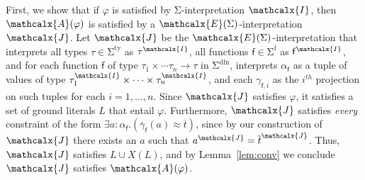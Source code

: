 \documentclass[runningheads,a4paper]{llncs}
\newcommand{\con}[1]{\mathsf{#1}}
\renewcommand\vec[1]{\overline{#1}}
\let\oldchi=\chi
\def\chi{{\vthinspace\oldchi}}
\let\oldSigma=\Sigma
\def\Sigma{\mathrm{\oldSigma}}
\newcommand{\teq}{\approx}
\newcommand{\I}{\mathcalx{I}}
\newcommand{\J}{\mathcalx{J}}
\newcommand{\conv}{\mathcalx{A}}
\newcommand{\stypes}[1]{#1^\mathrm{ty}}
\newcommand{\sfuns}[1]{#1^\mathrm{f}}
\newcommand{\sfundefs}[1]{#1^\mathrm{dfn}}
\newcommand{\ppos}{{+}}
\newcommand\ty[1]{\con{#1}}
\newcommand{\Bool}{\ty{Bool}}
\newcommand\concret{\gamma} %
\newcommand{\vecfarg}[1]{\vec{\concret}_{#1}}
\newcommand{\fargx}[2]{\concret_{#1,#2}}
\newcommand{\fargtype}[1]{\alpha_{#1}}
\newcommand{\extendsig}[1]{\mathcalx{E}( #1 )}
\newcommand{\vthinspace}{\kern+0.083333em}
\newcommand{\typ}[1]{^{\vthinspace #1}}
\newcommand{\absconstraints}{X}
\begin{document}
\begin{proofsketch}
First, we show that if $\varphi$ is satisfied by $\Sigma$-interpretation $\I$, then $\conv( \varphi )$ is satisfied by a $\extendsig{\Sigma}$-interpretation $\J$.
Let $\J$ be the $\extendsig{\Sigma}$-interpretation that interprets all types $\tau \in \stypes{\Sigma}$ as $\tau^\I$,
all functions $\con{f} \in \sfuns{\Sigma}$ as $\con{f}^\I$,
and for each function $\con{f}$ of type $\tau_1 \times \cdots \tau_n \rightarrow \tau$ in $\sfundefs{\Sigma}$,
interprets $\fargtype{\con{f}}$ as a tuple of values of type $\tau_1^\I \times \cdots \times \tau_n^\I$,
and each $\fargx{\con{f}}{i}$ as the $i^{th}$ projection on such tuples for each $i = 1, \ldots, n$.
Since $\J$ satisfies $\varphi$, it satisfies a set of ground literals $L$ that entail $\varphi$.
Furthermore, $\J$ satisfies \emph{every} constraint of the form $\exists a : {\fargtype{\con{f}}}. ( \vecfarg{\con{f}}( a ) \teq \vec t )$,
since by our construction of $\J$ there exists an $a$ such that $a^\J = \vec t^\J$.
Thus, $\J$ satisfies $L \cup \absconstraints( L )$, and by Lemma~\ref{lem:conv} we conclude $\J$ satisfies $\conv( \varphi )$.


\end{proofsketch}
\end{document}

